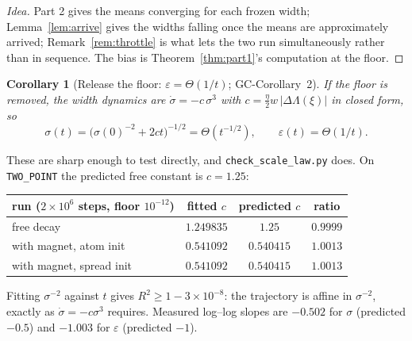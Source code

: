 \documentclass[11pt]{article}
\newtheorem{corollary}[theorem]{Corollary}
\theoremstyle{definition}
\newcommand{\GC}[1]{\textsf{GC-#1}}
\begin{document}
\begin{proof}[Idea]
Part 2 gives the means converging for each frozen width; Lemma~\ref{lem:arrive}
gives the widths falling once the means are approximately arrived;
Remark~\ref{rem:throttle} is what lets the two run simultaneously rather than in
sequence. The bias is Theorem~\ref{thm:part1}'s computation at the floor.
\end{proof}

\begin{corollary}[Release the floor: $\varepsilon = \Theta(1/t)$;
\GC{Corollary~2}]\label{cor:unfl}
If the floor is removed, the width dynamics are $\dot\sigma = -c\,\sigma^3$ with
$c = \tfrac{\eta}{2} w\,|\Delta \Lambda(\xi)|$ in closed form, so
\[
  \sigma(t) = \big(\sigma(0)^{-2} + 2ct\big)^{-1/2} = \Theta(t^{-1/2}),
  \qquad
  \varepsilon(t) = \Theta(1/t).
\]
\end{corollary}

These are sharp enough to test directly, and \texttt{check\_scale\_law.py} does.
On \texttt{TWO\_POINT} the predicted free constant is $c = 1.25$:

\begin{center}
\begin{tabular}{lccc}
\hline
run ($2\times10^6$ steps, floor $10^{-12}$) & fitted $c$ & predicted $c$ & ratio\\
\hline
free decay & $1.249835$ & $1.25$ & $0.9999$\\
with magnet, atom init & $0.541092$ & $0.540415$ & $1.0013$\\
with magnet, spread init & $0.541092$ & $0.540415$ & $1.0013$\\
\hline
\end{tabular}
\end{center}

\noindent Fitting $\sigma^{-2}$ against $t$ gives $R^2 \ge 1 - 3\times10^{-8}$:
the trajectory is affine in $\sigma^{-2}$, exactly as $\dot\sigma = -c\sigma^3$
requires. Measured log--log slopes are $-0.502$ for $\sigma$ (predicted $-0.5$)
and $-1.003$ for $\varepsilon$ (predicted $-1$).
\end{document}
